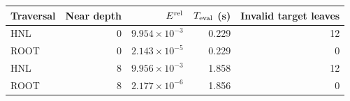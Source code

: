 \begin{tabular}{@{}lrrrr@{}}
\toprule
Traversal & Near depth & $E^{\rm rel}$ & $T_{\rm eval}$ (s) & Invalid target leaves\\
\midrule
HNL & 0 & $9.954\times10^{-3}$ & 0.229 & 12\\
ROOT & 0 & $2.143\times10^{-5}$ & 0.229 & 0\\
HNL & 8 & $9.956\times10^{-3}$ & 1.858 & 12\\
ROOT & 8 & $2.177\times10^{-6}$ & 1.856 & 0\\
\bottomrule
\end{tabular}
